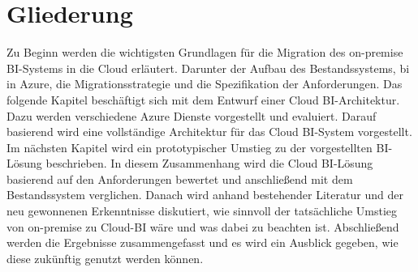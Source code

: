 \section{Gliederung} \label{sec:intro:struktur}
Zu Beginn werden die wichtigsten Grundlagen für die Migration des on-premise BI-Systems in die Cloud erläutert. Darunter der Aufbau des Bestandssystems, \ac{bi} in Azure, die Migrationsstrategie und die Spezifikation der Anforderungen. Das folgende Kapitel beschäftigt sich mit dem Entwurf einer Cloud BI-Architektur. Dazu werden verschiedene Azure Dienste vorgestellt und evaluiert. Darauf basierend wird eine vollständige Architektur für das Cloud BI-System vorgestellt. Im nächsten Kapitel wird ein prototypischer Umstieg zu der vorgestellten BI-Lösung beschrieben. In diesem Zusammenhang wird die Cloud BI-Lösung basierend auf den Anforderungen bewertet und anschließend mit dem Bestandssystem verglichen. Danach wird anhand bestehender Literatur und der neu gewonnenen Erkenntnisse diskutiert, wie sinnvoll der tatsächliche Umstieg von on-premise zu Cloud-BI wäre und was dabei zu beachten ist. Abschließend werden die Ergebnisse zusammengefasst und es wird ein Ausblick gegeben, wie diese zukünftig genutzt werden können.